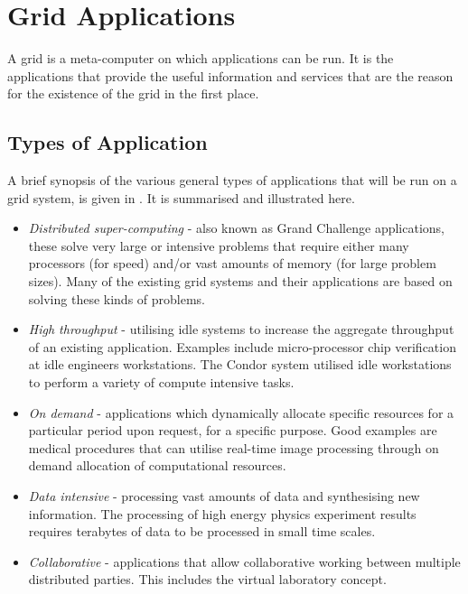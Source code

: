 
\section{Grid Applications}
\label{SEC:GRID:TYPES}
A grid is a meta-computer on which applications can be run.  It is the
applications that provide the useful information and services that are the
reason for the existence of the grid in the first place.

\subsection{Types of Application}

A brief synopsis of the various general types of applications that will be run
on a grid system, is given in \cite{grid-foster99-blueprint}.  It is summarised
and illustrated here.

\begin{itemize}

  \item{\emph{Distributed super-computing}} - also known as Grand Challenge
    applications, these solve very large or intensive problems that require
    either many processors (for speed) and/or vast amounts of memory (for large
    problem sizes). Many of the existing grid systems and their applications
    are based on solving these kinds of problems.

  \item{\emph{High throughput}} - utilising idle systems to increase the
    aggregate throughput of an existing application.  Examples include
    micro-processor chip verification at idle engineers workstations.  The
    Condor system\cite{grid-basney99-condor} utilised idle workstations to
    perform a variety of compute intensive tasks.

  \item{\emph{On demand}} - applications which dynamically allocate specific
    resources for a particular period upon request, for a specific purpose.
    Good examples are medical procedures that can utilise real-time image
    processing through on demand allocation of computational resources.

  \item{\emph{Data intensive}} - processing vast amounts of data and
    synthesising new information.  The processing of high energy physics
    experiment results requires terabytes of data to be processed in small time
    scales.

  \item{\emph{Collaborative}} - applications that allow collaborative working
    between multiple distributed parties.  This includes the virtual laboratory
    concept.

\end{itemize}

